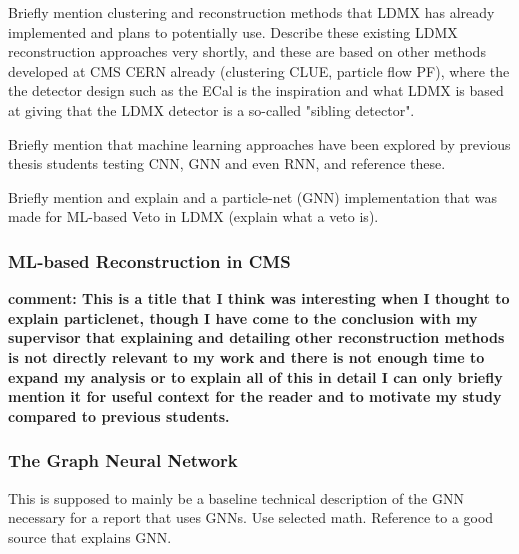 Briefly mention clustering and reconstruction methods that LDMX has already implemented and plans to potentially use. Describe these existing LDMX reconstruction approaches very shortly, and these are based on other methods developed at CMS CERN already (clustering CLUE, particle flow PF), where the the detector design such as the ECal is the inspiration and what LDMX is based at giving that the LDMX detector is a so-called "sibling detector".

Briefly mention that machine learning approaches have been explored by previous thesis students testing CNN, GNN and even RNN, and reference these. 

Briefly mention and explain and a particle-net (GNN) implementation that was made for ML-based Veto in LDMX (explain what a veto is). 


\subsubsection{ML-based Reconstruction in CMS}

\textbf{comment: This is a title that I think was interesting when I thought to explain particlenet, though I have come to the conclusion with my supervisor that explaining and detailing other reconstruction methods is not directly relevant to my work and there is not enough time to expand my analysis or to explain all of this in detail I can only briefly mention it for useful context for the reader and to motivate my study compared to previous students.}



\subsubsection{The Graph Neural Network}

This is supposed to mainly be a baseline technical description of the GNN necessary for a report that uses GNNs. Use selected math. Reference to a good source that explains GNN.

